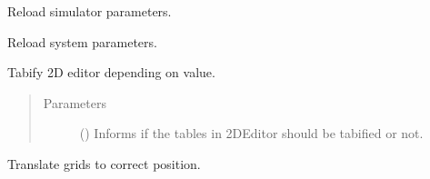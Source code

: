 \documentclass[a4paper,10pt,english]{sphinxmanual}
\begin{document}
\begin{fulllineitems}

\begin{fulllineitems}
\label{\detokenize{autodoc/mrsprint/mrsprint:mrsprint.mainwindow.MainWindow.simulatorSettingsChanges}}
Reload simulator parameters.

\end{fulllineitems}


\begin{fulllineitems}
\label{\detokenize{autodoc/mrsprint/mrsprint:mrsprint.mainwindow.MainWindow.systemSettingsChanges}}
Reload system parameters.

\end{fulllineitems}


\begin{fulllineitems}
\label{\detokenize{autodoc/mrsprint/mrsprint:mrsprint.mainwindow.MainWindow.tabify2DEditor}}
Tabify 2D editor depending on value.
\begin{quote}\begin{description}
\item[{Parameters}] \leavevmode
{} () \textendash{} Informs if the tables in 2DEditor should be tabified or not.

\end{description}\end{quote}

\end{fulllineitems}


\begin{fulllineitems}
\label{\detokenize{autodoc/mrsprint/mrsprint:mrsprint.mainwindow.MainWindow.translateGrid3DView}}
Translate grids to correct position.


\end{fulllineitems}
\end{fulllineitems}
\end{document}
